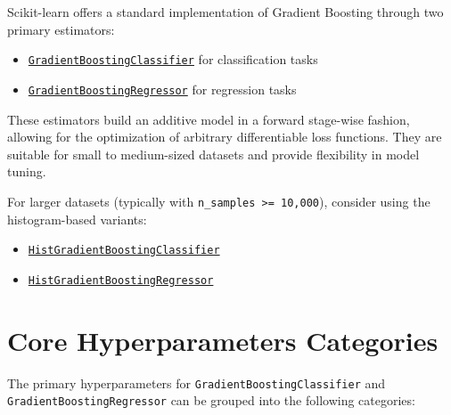 \documentclass[
  letterpaper,
  DIV=11,
  numbers=noendperiod]{scrreprt}
\providecommand{\tightlist}{%
  \setlength{\itemsep}{0pt}\setlength{\parskip}{0pt}}\usepackage{longtable,booktabs,array}
\begin{document}
Scikit-learn offers a standard implementation of Gradient Boosting
through two primary estimators:

\begin{itemize}
\tightlist
\item
  \href{https://scikit-learn.org/stable/modules/generated/sklearn.ensemble.GradientBoostingClassifier.html}{\texttt{GradientBoostingClassifier}}
  for classification tasks
\item
  \href{https://scikit-learn.org/stable/modules/generated/sklearn.ensemble.GradientBoostingRegressor.html}{\texttt{GradientBoostingRegressor}}
  for regression tasks
\end{itemize}

These estimators build an additive model in a forward stage-wise
fashion, allowing for the optimization of arbitrary differentiable loss
functions. They are suitable for small to medium-sized datasets and
provide flexibility in model tuning.

For larger datasets (typically with
\texttt{n\_samples\ \textgreater{}=\ 10,000}), consider using the
histogram-based variants:

\begin{itemize}
\tightlist
\item
  \href{https://scikit-learn.org/stable/modules/generated/sklearn.ensemble.HistGradientBoostingClassifier.html}{\texttt{HistGradientBoostingClassifier}}
\item
  \href{https://scikit-learn.org/stable/modules/generated/sklearn.ensemble.HistGradientBoostingRegressor.html}{\texttt{HistGradientBoostingRegressor}}
\end{itemize}

\section{Core Hyperparameters
Categories}\label{core-hyperparameters-categories}

The primary hyperparameters for \texttt{GradientBoostingClassifier} and
\texttt{GradientBoostingRegressor} can be grouped into the following
categories:
\end{document}
